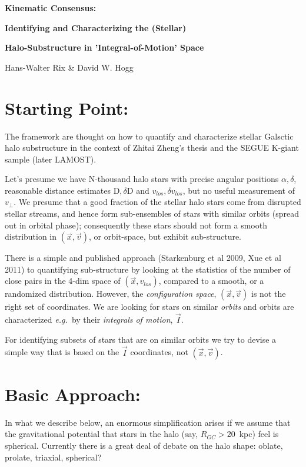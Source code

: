 \documentclass[12pt,a4paper,twoside]{article}
\newcommand{\D}{{\mathrm D}}
\newcommand{\dD}{\delta{\mathrm D}}
\newcommand{\vlos}{v_{los}}
\newcommand{\dvlos}{\delta\vlos}
\newcommand{\vperp}{v_\perp}
\newcommand{\vx}{\vec{x}}
\newcommand{\vv}{\vec{v}}
\newcommand{\vI}{\vec{I}}
\newcommand{\eg}{{\it e.g.~}}
\begin{document}
\centerline{\Large\bf Kinematic Consensus:}
\centerline{\Large\bf Identifying and Characterizing the (Stellar)}
\centerline{\Large\bf Halo-Substructure in 'Integral-of-Motion' Space}

\vspace{1em}
\centerline{\large Hans-Walter Rix \& David W. Hogg }
\vspace{0.5em}

\section{Starting Point:}

The framework are thought on how to quantify and characterize stellar Galsctic 
halo substructure in the context of Zhitai Zheng's thesis and the SEGUE K-giant sample (later LAMOST). 

Let's presume we have N-thousand halo stars with precise angular positions $\alpha,\delta$, 
reasonable distance estimates $\D,\dD$ and $\vlos,\dvlos$, but no useful measurement 
of $\vperp$. We presume that a good fraction of the stellar halo stars come from disrupted stellar streams, and hence form sub-ensembles of stars with similar orbits (spread out in orbital phase); consequently these stars should not form a smooth distribution in $(\vx,\vv)$, or orbit-space, but exhibit sub-structure. 

There is a simple and published approach (Starkenburg et al 2009, Xue et al 2011) to quantifying sub-structure by looking at the statistics of the number of close pairs in the 4-dim space of
$(\vx,\vlos)$, compared to a smooth, or a randomized distribution. However, the {\it configuration space}, $(\vx,\vv)$ is not the right set of coordinates. We are looking for stars on similar {\sl orbits} and orbits are characterized \eg by their {\sl integrals of motion}, $\vI$. 

For identifying subsets of stars that are on similar orbits we try to devise a simple way 
that is based on the $\vI$ coordinates, not $(\vx,\vv)$. 

\section{Basic Approach:}

In what we describe below, an enormous simplification arises if we assume that the gravitational potential that stars in the halo (say, $R_{GC}>20$~kpc) feel is spherical. Currently there is a great deal of debate on the halo shape: oblate, prolate, triaxial, spherical? 
\end{document}
